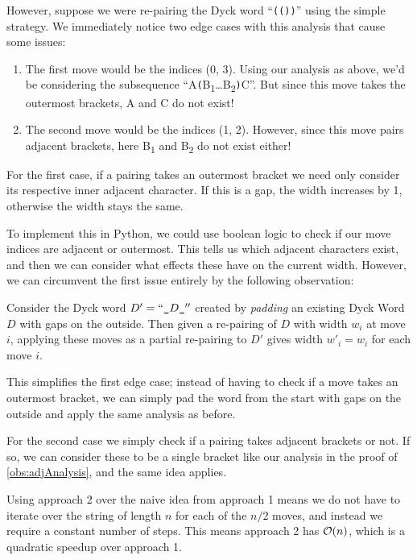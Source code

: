 However, suppose we were re-pairing the Dyck word ``\texttt{(())}'' using the simple strategy. We immediately notice two edge cases with this analysis that cause some issues:
\begin{enumerate}
    \item The first move would be the indices (0, 3). Using our analysis as above, we'd be considering the subsequence ``A\texttt{(}B\textsubscript{1}\dots B\textsubscript{2}\texttt{)}C''. But since this move takes the outermost brackets, A and C do not exist!
    \item The second move would be the indices (1, 2). However, since this move pairs adjacent brackets, here B\textsubscript{1} and B\textsubscript{2} do not exist either!
\end{enumerate}

For the first case, if a pairing takes an outermost bracket we need only consider its respective inner adjacent character. If this is a gap, the width increases by 1, otherwise the width stays the same.

To implement this in Python, we could use boolean logic to check if our move indices are adjacent or outermost. This tells us which adjacent characters exist, and then we can consider what effects these have on the current width. However, we can circumvent the first issue entirely by the following observation:

\begin{observation}
    Consider the Dyck word $D' = ``\texttt{\string_}D\texttt{\string_}''$ created by \textit{padding} an existing Dyck Word $D$ with gaps on the outside. Then given a re-pairing of $D$ with width $w_{i}$ at move $i$, applying these moves as a partial re-pairing to $D'$ gives width $w'_{i} = w_{i}$ for each move $i$.
\end{observation}

This simplifies the first edge case; instead of having to check if a move takes an outermost bracket, we can simply pad the word from the start with gaps on the outside and apply the same analysis as before. 

For the second case we simply check if a pairing takes adjacent brackets or not. If so, we can consider these to be a single bracket like our analysis in the proof of \autoref{obs:adjAnalysis}, and the same idea applies.

Using approach 2 over the naive idea from approach 1 means we do not have to iterate over the string of length $n$ for each of the $n/2$ moves, and instead we require a constant number of steps. This means approach 2 has $\mathcal{O}(n)$, which is a quadratic speedup over approach 1.


